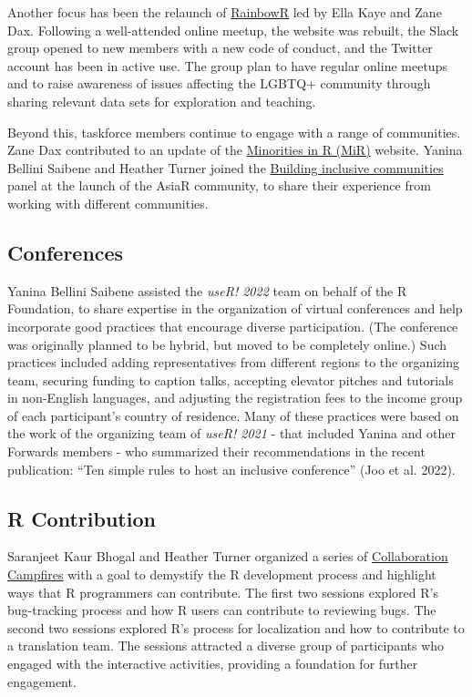 Another focus has been the relaunch of \href{https://rainbowr.netlify.app/}{RainbowR} led by Ella Kaye and Zane Dax. Following a well-attended online meetup, the website was rebuilt, the Slack group opened to new members with a new code of conduct, and the Twitter account has been in active use. The group plan to have regular online meetups and to raise awareness of issues affecting the LGBTQ+ community through sharing relevant data sets for exploration and teaching.

Beyond this, taskforce members continue to engage with a range of communities. Zane Dax contributed to an update of the \href{https://mircommunity.com/about/}{Minorities in R (MiR)} website. Yanina Bellini Saibene and Heather Turner joined the \href{https://github.com/AsiaR-community/2022-inclusive_communities}{Building inclusive communities} panel at the launch of the AsiaR community, to share their experience from working with different communities.

\hypertarget{conferences}{%
\subsection{Conferences}\label{conferences}}

Yanina Bellini Saibene assisted the \emph{useR! 2022} team on behalf of the R Foundation, to share expertise in the organization of virtual conferences and help incorporate good practices that encourage diverse participation. (The conference was originally planned to be hybrid, but moved to be completely online.) Such practices included adding representatives from different regions to the organizing team, securing funding to caption talks, accepting elevator pitches and tutorials in non-English languages, and adjusting the registration fees to the income group of each participant's country of residence. Many of these practices were based on the work of the organizing team of \emph{useR! 2021} - that included Yanina and other Forwards members - who summarized their recommendations in the recent publication: ``Ten simple rules to host an inclusive conference'' (Joo et al. 2022).

\hypertarget{r-contribution}{%
\subsection{R Contribution}\label{r-contribution}}

Saranjeet Kaur Bhogal and Heather Turner organized a series of \href{https://contributor.r-project.org/events/collaboration-campfires}{Collaboration Campfires} with a goal to demystify the R development process and highlight ways that R programmers can contribute. The first two sessions explored R's bug-tracking process and how R users can contribute to reviewing bugs. The second two sessions explored R's process for localization and how to contribute to a translation team. The sessions attracted a diverse group of participants who engaged with the interactive activities, providing a foundation for further engagement.

